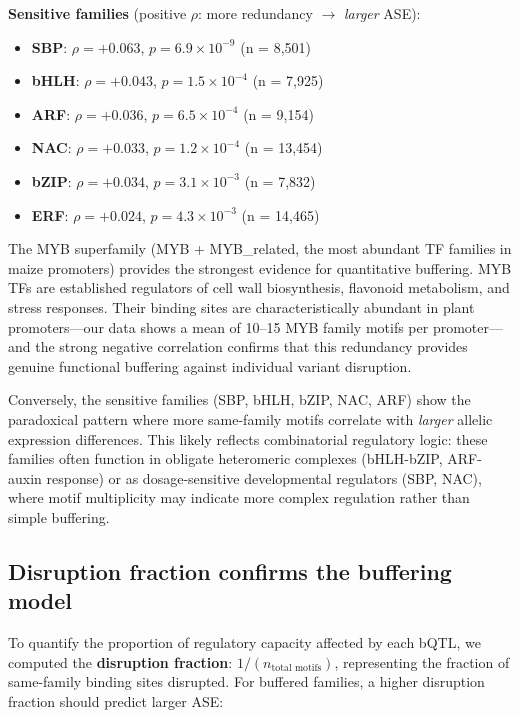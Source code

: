\documentclass[11pt,a4paper]{article}
\begin{document}
\textbf{Sensitive families} (positive $\rho$: more redundancy $\rightarrow$ \textit{larger} ASE):
\begin{itemize}
    \item \textbf{SBP}: $\rho = +0.063$, $p = 6.9 \times 10^{-9}$ (n = 8,501)
    \item \textbf{bHLH}: $\rho = +0.043$, $p = 1.5 \times 10^{-4}$ (n = 7,925)
    \item \textbf{ARF}: $\rho = +0.036$, $p = 6.5 \times 10^{-4}$ (n = 9,154)
    \item \textbf{NAC}: $\rho = +0.033$, $p = 1.2 \times 10^{-4}$ (n = 13,454)
    \item \textbf{bZIP}: $\rho = +0.034$, $p = 3.1 \times 10^{-3}$ (n = 7,832)
    \item \textbf{ERF}: $\rho = +0.024$, $p = 4.3 \times 10^{-3}$ (n = 14,465)
\end{itemize}

The MYB superfamily (MYB + MYB\_related, the most abundant TF families in maize promoters) provides the strongest evidence for quantitative buffering. MYB TFs are established regulators of cell wall biosynthesis, flavonoid metabolism, and stress responses. Their binding sites are characteristically abundant in plant promoters---our data shows a mean of 10--15 MYB family motifs per promoter---and the strong negative correlation confirms that this redundancy provides genuine functional buffering against individual variant disruption.

Conversely, the sensitive families (SBP, bHLH, bZIP, NAC, ARF) show the paradoxical pattern where more same-family motifs correlate with \textit{larger} allelic expression differences. This likely reflects combinatorial regulatory logic: these families often function in obligate heteromeric complexes (bHLH-bZIP, ARF-auxin response) or as dosage-sensitive developmental regulators (SBP, NAC), where motif multiplicity may indicate more complex regulation rather than simple buffering.

\subsection{Disruption fraction confirms the buffering model}

To quantify the proportion of regulatory capacity affected by each bQTL, we computed the \textbf{disruption fraction}: $1 / (n_\text{total motifs})$, representing the fraction of same-family binding sites disrupted. For buffered families, a higher disruption fraction should predict larger ASE:
\end{document}
